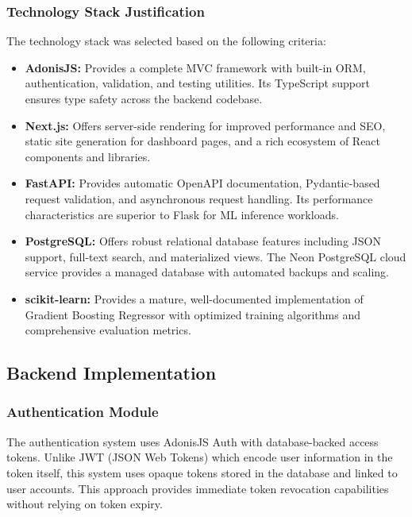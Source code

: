 \subsubsection{Technology Stack Justification}

The technology stack was selected based on the following criteria:

\begin{itemize}
  \item \textbf{AdonisJS:} Provides a complete MVC framework with built-in ORM, authentication, validation, and testing utilities. Its TypeScript support ensures type safety across the backend codebase.
  \item \textbf{Next.js:} Offers server-side rendering for improved performance and SEO, static site generation for dashboard pages, and a rich ecosystem of React components and libraries.
  \item \textbf{FastAPI:} Provides automatic OpenAPI documentation, Pydantic-based request validation, and asynchronous request handling. Its performance characteristics are superior to Flask for ML inference workloads.
  \item \textbf{PostgreSQL:} Offers robust relational database features including JSON support, full-text search, and materialized views. The Neon PostgreSQL cloud service provides a managed database with automated backups and scaling.
  \item \textbf{scikit-learn:} Provides a mature, well-documented implementation of Gradient Boosting Regressor with optimized training algorithms and comprehensive evaluation metrics.
\end{itemize}

\subsection{Backend Implementation}

\subsubsection{Authentication Module}

The authentication system uses AdonisJS Auth with database-backed access tokens. Unlike JWT (JSON Web Tokens) which encode user information in the token itself, this system uses opaque tokens stored in the database and linked to user accounts. This approach provides immediate token revocation capabilities without relying on token expiry.

